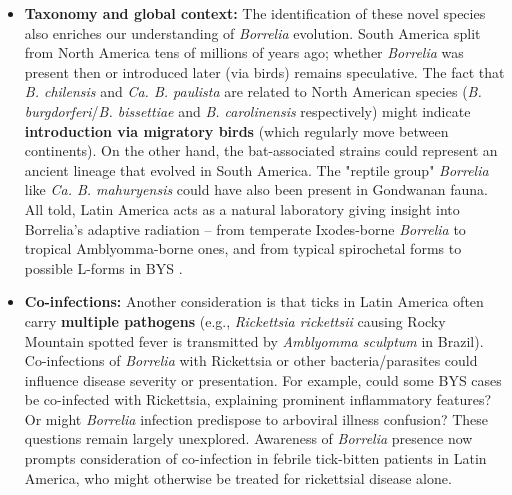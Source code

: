 \documentclass[11pt,letterpaper]{article}
\begin{document}
\begin{itemize}
    \item \textbf{Taxonomy and global context:} The identification of these novel species also enriches our understanding of \textit{Borrelia} evolution. South America split from North America tens of millions of years ago; whether \textit{Borrelia} was present then or introduced later (via birds) remains speculative. The fact that \textit{B. chilensis} and \textit{Ca. B. paulista} are related to North American species (\textit{B. burgdorferi}/\textit{B. bissettiae} and \textit{B. carolinensis} respectively) might indicate \textbf{introduction via migratory birds} (which regularly move between continents). On the other hand, the bat-associated strains could represent an ancient lineage that evolved in South America. The "reptile group" \textit{Borrelia} like \textit{Ca. B. mahuryensis} could have also been present in Gondwanan fauna. All told, Latin America acts as a natural laboratory giving insight into Borrelia's adaptive radiation – from temperate Ixodes-borne \textit{Borrelia} to tropical Amblyomma-borne ones, and from typical spirochetal forms to possible L-forms in BYS \citep{Yoshinari2022ai, Yoshinari2022aj}.

    \item \textbf{Co-infections:} Another consideration is that ticks in Latin America often carry \textbf{multiple pathogens} (e.g., \textit{Rickettsia rickettsii} causing Rocky Mountain spotted fever is transmitted by \textit{Amblyomma sculptum} in Brazil). Co-infections of \textit{Borrelia} with Rickettsia or other bacteria/parasites could influence disease severity or presentation. For example, could some BYS cases be co-infected with Rickettsia, explaining prominent inflammatory features? Or might \textit{Borrelia} infection predispose to arboviral illness confusion? These questions remain largely unexplored. Awareness of \textit{Borrelia} presence now prompts consideration of co-infection in febrile tick-bitten patients in Latin America, who might otherwise be treated for rickettsial disease alone.
\end{itemize}
\end{document}
